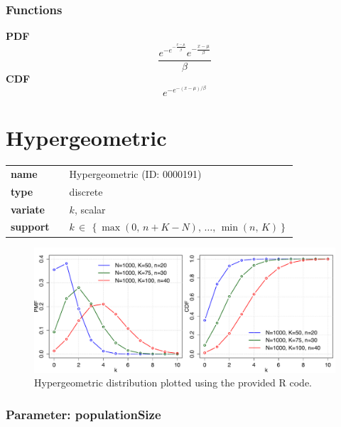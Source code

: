\documentclass{article}
\begin{document}
\subsubsection*{Functions}

\smallskip \noindent \hspace{.2cm} \textbf{PDF} 
\begin{equation*}\frac{e^{-e^{-\frac{x-\mu}{\beta}}} e^{-\frac{x-\mu}{\beta}}}{\beta}\end{equation*}
\smallskip \noindent \hspace{.2cm} \textbf{CDF} 
\begin{equation*}e^{-e^{-(x-\mu)/\beta}}\end{equation*}
\smallskip\section*{Hypergeometric} 

  \bigskip 

\begin{tabular}{p{2cm}cl}
\textbf{name} & & Hypergeometric (ID: 0000191)\\ 
 
\textbf{type} & & discrete \\ 

\textbf{variate} & & $k
$, scalar \\ 

\textbf{support} & & $k\, \in\, \left\{\max{(0,\, n+K-N)},\, \dots,\, \min{(n,\, K )}\right\}$
\end{tabular}

\begin{figure}[ht!]
\centering
  \includegraphics[width=140mm]{pics/Hypergeometric.pdf}
 \caption{Hypergeometric distribution plotted using the provided R code.}
 \label{fig:Hypergeometric}
\end{figure}

\subsubsection*{Parameter: populationSize}
\end{document}
